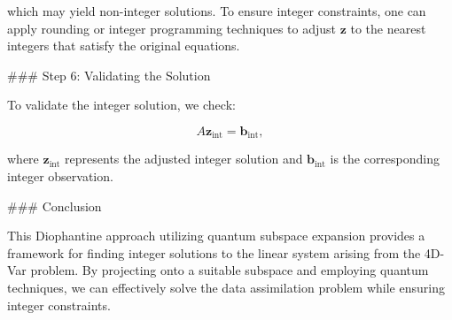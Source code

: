 \documentclass{article}
\begin{document}
which may yield non-integer solutions. To ensure integer constraints, one can apply rounding or integer programming techniques to adjust \( \mathbf{z} \) to the nearest integers that satisfy the original equations.

### Step 6: Validating the Solution

To validate the integer solution, we check:

\begin{equation}
A \mathbf{z}_{\text{int}} = \mathbf{b}_{\text{int}},
\end{equation}

where \( \mathbf{z}_{\text{int}} \) represents the adjusted integer solution and \( \mathbf{b}_{\text{int}} \) is the corresponding integer observation.

### Conclusion

This Diophantine approach utilizing quantum subspace expansion provides a framework for finding integer solutions to the linear system arising from the 4D-Var problem. By projecting onto a suitable subspace and employing quantum techniques, we can effectively solve the data assimilation problem while ensuring integer constraints.
\end{document}
